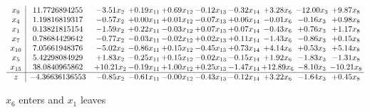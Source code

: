 \documentclass[9pt]{article}
\begin{document}
 \[\begin{array}{c| c c@{\hskip 2pt} c@{\hskip 2pt} c@{\hskip 2pt} c@{\hskip 2pt} c@{\hskip 2pt} c@{\hskip 2pt} c@{\hskip 2pt} c@{\hskip 2pt} }
 x_{9}   &  11.7726894255 & -3.51 x_{2} & +  0.19 x_{11} & +  0.69 x_{12} & -0.12 x_{13} & -0.32 x_{14} & +  3.28 x_{6} & -12.00 x_{3} & +  9.87 x_{8}\\
 x_{4}   &  1.19816819317 & -0.57 x_{2} & +  0.00 x_{11} & +  0.01 x_{12} & -0.07 x_{13} & +  0.06 x_{14} & -0.01 x_{6} & -0.16 x_{3} & +  0.98 x_{8}\\
 x_{1}   &  0.13821815154 & -1.59 x_{2} & +  0.22 x_{11} & -0.03 x_{12} & +  0.07 x_{13} & +  0.07 x_{14} & -0.43 x_{6} & +  0.76 x_{3} & +  1.17 x_{8}\\
 x_{7}   &  0.78684429642 & -0.77 x_{2} & -0.03 x_{11} & -0.02 x_{12} & +  0.02 x_{13} & +  0.11 x_{14} & -1.43 x_{6} & -0.86 x_{3} & +  0.15 x_{8}\\
 x_{10}   &  7.05661948376 & -5.02 x_{2} & -0.86 x_{11} & +  0.15 x_{12} & -0.45 x_{13} & +  0.73 x_{14} & +  4.14 x_{6} & +  0.53 x_{3} & +  5.14 x_{8}\\
 x_{5}   &  5.42298084929 & +  1.83 x_{2} & -0.25 x_{11} & +  0.15 x_{12} & -0.02 x_{13} & -0.15 x_{14} & +  1.92 x_{6} & -1.83 x_{3} & -1.31 x_{8}\\
 x_{15}   &  38.0840965862 & + 10.21 x_{2} & -0.19 x_{11} & +  1.00 x_{12} & +  0.25 x_{13} & -1.47 x_{14} & + 12.89 x_{6} & -8.10 x_{3} & -10.21 x_{8}\\
\hline
z    &  -4.36636136553 & -0.85 x_{2} & -0.61 x_{11} & -0.00 x_{12} & -0.43 x_{13} & -0.12 x_{14} & +  3.22 x_{6} & -1.64 x_{3} & +  0.45 x_{8}\\
\end{array}\]


 $ x_{6} $ enters and $ x_{1} $ leaves 
\end{document}
